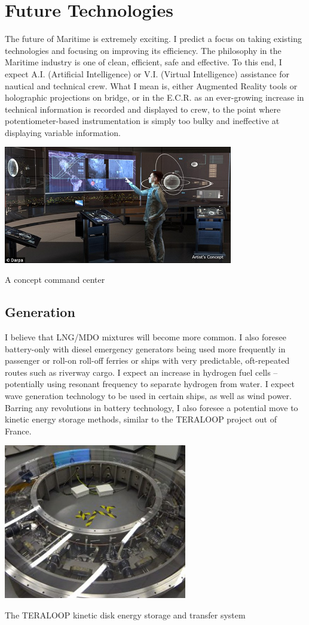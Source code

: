 \documentclass[11pt,a4paper]{article}
\begin{document}
\section{Future Technologies}
The future of Maritime is extremely exciting. I predict a focus on taking existing technologies and focusing on improving its efficiency. The philosophy in the Maritime industry is one of clean, efficient, safe and effective. To this end, I expect A.I. (Artificial Intelligence) or V.I. (Virtual Intelligence) assistance for nautical and technical crew. What I mean is, either Augmented Reality tools or holographic projections on bridge, or in the E.C.R. as an ever-growing increase in technical information is recorded and displayed to crew, to the point where potentiometer-based instrumentation is simply too bulky and ineffective at displaying variable information.
\begin{center}
\includegraphics[width=10cm]{controlcenter}\par
A concept command center
\end{center}
\subsection*{Generation}
I believe that LNG/MDO mixtures will become more common. I also foresee battery-only with diesel emergency generators being used more frequently in passenger or roll-on roll-off ferries or ships with very predictable, oft-repeated routes such as riverway cargo. I expect an increase in hydrogen fuel cells -- potentially using resonant frequency to separate hydrogen from water. I expect wave generation technology to be used in certain ships, as well as wind power. Barring any revolutions in battery technology, I also foresee a potential move to kinetic energy storage methods, similar to the TERALOOP project out of France.

\begin{center}
\includegraphics[width=8cm]{teraloop}\par
The TERALOOP kinetic disk energy storage and transfer system
\end{center}
\end{document}
